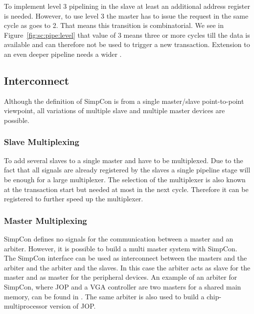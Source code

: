To implement level 3 pipelining in the slave at least an additional
address register is needed. However, to use level 3 the master has
to issue the request in the same cycle as  goes to 2.
That means this transition is combinatorial. We see in
Figure~\ref{fig:sc:pipe:level} that  value of 3 means
three or more cycles till the data is available and can therefore
not be used to trigger a new transaction. Extension to an even
deeper pipeline needs a wider .


\subsection{Interconnect}

Although the definition of SimpCon is from a single master/slave
point-to-point viewpoint, all variations of multiple slave and
multiple master devices are possible.

\subsubsection{Slave Multiplexing}

To add several slaves to a single master  and
 have to be multiplexed. Due to the fact that all
 signals are already registered by the slaves a
single pipeline stage will be enough for a large multiplexer. The
selection of the multiplexer is also known at the transaction start
but needed at most in the next cycle. Therefore it can be registered
to further speed up the multiplexer.


\subsubsection{Master Multiplexing}

SimpCon defines no signals for the communication between a master
and an arbiter. However, it is possible to build a multi master
system with SimpCon. The SimpCon interface can be used as
interconnect between the masters and the arbiter and the arbiter and
the slaves. In this case the arbiter acts as slave for the master
and as master for the peripheral devices. An example of an arbiter
for SimpCon, where JOP and a VGA controller are two masters for a
shared main memory, can be found in \cite{jop:dma}. The same arbiter
is also used to build a chip-multiprocessor version of JOP.


